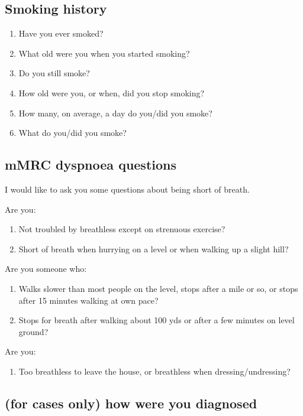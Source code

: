 \documentclass[a4paper,10pt]{article}
\begin{document}
\subsection{Smoking history}

\begin{enumerate}
\item Have you ever smoked?
\item What old were you when you started smoking?
\item Do you still smoke?
\item How old were you, or when, did you stop smoking?
\item How many, on average, a day do you/did you smoke?
\item What do you/did you smoke?
\end{enumerate}

\subsection{mMRC dyspnoea questions} 

I would like to ask you some questions about being short of breath.

Are you:

\begin{enumerate}
\item Not troubled by breathless except on strenuous exercise?
\item Short of breath when hurrying on a level or when walking up a slight hill?
\end{enumerate}

Are you someone who:

\begin{enumerate}[resume]
\item Walks slower than most people on the level, stops after a mile or so, or stops after 15 minutes walking at own pace?
\item Stops for breath after walking about 100 yds or after a few minutes on level ground?
\end{enumerate}

Are you:

\begin{enumerate}[resume]
\item Too breathless to leave the house, or breathless when dressing/undressing?
\end{enumerate}

\subsection{(for cases only) how were you diagnosed}
\end{document}
